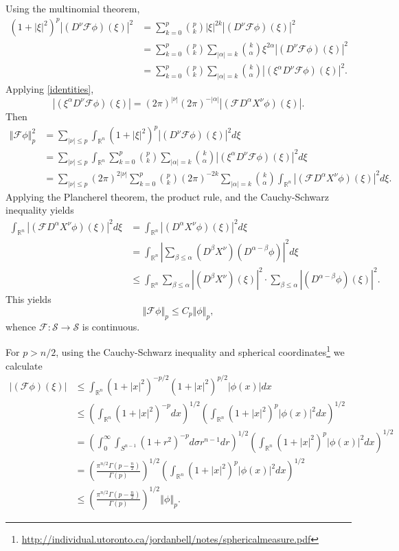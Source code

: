 \documentclass{article}
\newcommand{\norm}[1]{\left\Vert #1 \right\Vert}
\theoremstyle{definition}
\begin{document}
Using the multinomial theorem,
\begin{align*}
(1+|\xi|^2)^p |(D^\nu \mathscr{F} \phi)(\xi)|^2&=\sum_{k=0}^p \binom{p}{k} |\xi|^{2k} |(D^\nu \mathscr{F} \phi)(\xi)|^2\\
&=\sum_{k=0}^p \binom{p}{k}  \sum_{|\alpha|=k} \binom{k}{\alpha} \xi^{2\alpha} |(D^\nu \mathscr{F} \phi)(\xi)|^2\\
&=\sum_{k=0}^p \binom{p}{k} \sum_{|\alpha|=k} \binom{k}{\alpha} 
|(\xi^\alpha D^\nu \mathscr{F} \phi)(\xi)|^2.
\end{align*}
Applying \eqref{identities},
\[
|(\xi^\alpha D^\nu \mathscr{F} \phi)(\xi)| = (2\pi)^{|\nu|} (2\pi)^{-|\alpha|} |(\mathscr{F} D^\alpha X^\nu \phi)(\xi)|.
\]
Then 
\begin{align*}
\norm{\mathscr{F} \phi}_p^2 &= \sum_{|\nu| \leq p} \int_{\mathbb{R}^n}
(1+|\xi|^2)^p |(D^\nu \mathscr{F} \phi)(\xi)|^2 d\xi\\
&=\sum_{|\nu| \leq p} \int_{\mathbb{R}^n} \sum_{k=0}^p \binom{p}{k} \sum_{|\alpha|=k} \binom{k}{\alpha}
|(\xi^\alpha D^\nu \mathscr{F}\phi)(\xi)|^2 d\xi\\
&=\sum_{|\nu| \leq p} (2\pi)^{2|\nu|} \sum_{k=0}^p \binom{p}{k} (2\pi)^{-2k} \sum_{|\alpha|=k} \binom{k}{\alpha}
\int_{\mathbb{R}^n} |(\mathscr{F} D^\alpha X^\nu \phi)(\xi)|^2 d\xi.
\end{align*}
Applying the Plancherel theorem, the product rule, and the Cauchy-Schwarz inequality yields
\begin{align*}
\int_{\mathbb{R}^n} |(\mathscr{F} D^\alpha X^\nu \phi)(\xi)|^2 d\xi&=
\int_{\mathbb{R}^n} |(D^\alpha X^\nu \phi)(\xi)|^2 d\xi\\
&=\int_{\mathbb{R}^n} \left| \sum_{\beta \leq \alpha} (D^\beta X^\nu)(D^{\alpha-\beta}\phi) \right|^2 d\xi\\
&\leq \int_{\mathbb{R}^n} \sum_{\beta \leq \alpha}
|(D^\beta X^\nu)(\xi)|^2 
\cdot \sum_{\beta \leq \alpha} |(D^{\alpha-\beta}\phi)(\xi)|^2. 
\end{align*}
This yields
\[
\norm{\mathscr{F} \phi}_p \leq C_p \norm{\phi}_p,
\]
whence $\mathscr{F}:\mathscr{S} \to \mathscr{S}$ is continuous. 


For $p>n/2$, using the Cauchy-Schwarz inequality and spherical coordinates\footnote{\url{http://individual.utoronto.ca/jordanbell/notes/sphericalmeasure.pdf}} we calculate
\begin{align*}
|(\mathscr{F} \phi)(\xi)|&
\leq \int_{\mathbb{R}^n} (1+|x|^2)^{-p/2} (1+|x|^2)^{p/2}  |\phi(x)| dx\\
&\leq \left( \int_{\mathbb{R}^n} (1+|x|^2)^{-p} dx \right)^{1/2} \left( \int_{\mathbb{R}^n}
(1+|x|^2)^{p}  |\phi(x)|^2 dx \right)^{1/2}\\
 &=\left( \int_0^\infty \int_{S^{n-1}} (1+r^2)^{-p} d\sigma r^{n-1} dr\right)^{1/2} 
 \left( \int_{\mathbb{R}^n}
(1+|x|^2)^{p}  |\phi(x)|^2 dx \right)^{1/2}\\
 &=\left( \frac{\pi^{n/2} \Gamma\left(p-\frac{n}{2}\right)}{\Gamma(p)} \right)^{1/2} \left( \int_{\mathbb{R}^n}
(1+|x|^2)^{p}  |\phi(x)|^2 dx \right)^{1/2}\\
&\leq \left( \frac{\pi^{n/2} \Gamma\left(p-\frac{n}{2}\right)}{\Gamma(p)} \right)^{1/2} 
\norm{\phi}_p.
\end{align*}
\end{document}
